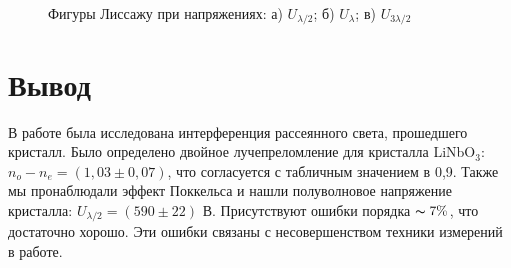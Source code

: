 \documentclass[a4paper,12pt]{article} %
\begin{document}
\begin{enumerate}
\begin{figure}[h!]
\begin{minipage}[h]{0.3\linewidth}
			\end{minipage}
		\caption{Фигуры Лиссажу при напряжениях: а) $U_{\lambda / 2}$; б) $U_\lambda$; в) $U_{3\lambda / 2}$}
		\end{figure}
	\end{enumerate}

	\newpage
	\section*{Вывод}
	В работе была исследована интерференция рассеянного света, прошедшего кристалл. Было определено двойное лучепреломление для кристалла LiNbO$_3$: $n_o - n_e = (1,03 \pm 0,07)$, что согласуется с табличным значением в 0,9. Также мы пронаблюдали эффект Поккельса и нашли полуволновое напряжение кристалла: $U_{\lambda / 2} = (590 \pm 22)$ В. Присутствуют ошибки порядка $\thicksim 7\%$, что достаточно хорошо. Эти ошибки связаны с несовершенством техники измерений в работе.
\end{document}
